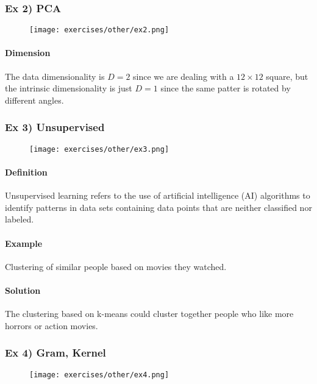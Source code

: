 \subsubsection{Ex 2) PCA}

\begin{figure}[H]
    \centering
    \texttt{[image: exercises/other/ex2.png]}
\end{figure}

\paragraph{Dimension}
The data dimensionality is $D=2$ since we are dealing with a $12\times 12$ square, but the intrinsic dimensionality is just $D=1$ since the same patter is rotated by different angles.


\subsubsection{Ex 3) Unsupervised}

\begin{figure}[H]
    \centering
    \texttt{[image: exercises/other/ex3.png]}
\end{figure}


\paragraph{Definition}
Unsupervised learning refers to the use of artificial intelligence (AI) algorithms to identify patterns in data sets containing data points that are neither classified nor labeled.

\paragraph{Example}
Clustering of similar people based on movies they watched.

\paragraph{Solution}
The clustering based on k-means could cluster together people who like more horrors or action movies.


\subsubsection{Ex 4) Gram, Kernel}

\begin{figure}[H]
    \centering
    \texttt{[image: exercises/other/ex4.png]}
\end{figure}
